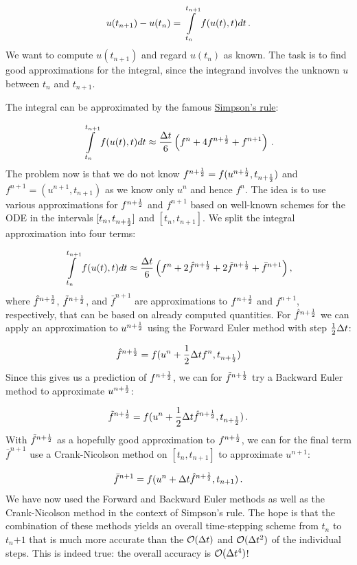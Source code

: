 \documentclass[%
oneside,                 %
final,                   %
10pt]{article}
\begin{document}
\[ u(t_{n+1}) - u(t_n) = \int\limits_{t_{n}}^{t_{n+1}} f(u(t),t)dt\thinspace . \]
We want to compute $u(t_{n+1})$ and regard $u(t_n)$ as known.
The task is to find good approximations for the integral, since the
integrand involves the unknown $u$ between $t_n$ and $t_{n+1}$.

The integral can be approximated by the famous
\href{{http://en.wikipedia.org/wiki/Simpson's_rule}}{Simpson's rule}:

\[ \int\limits_{t_{n}}^{t_{n+1}} f(u(t),t)dt
\approx \frac{\Delta t}{6}\left( f^n + 4f^{n+\frac{1}{2}} + f^{n+1}\right)\thinspace .\]
The problem now is that we do not know $f^{n+\frac{1}{2}}=f(u^{n+\frac{1}{2}},t_{n+\frac{1}{2}})$
and $f^{n+1}=(u^{n+1},t_{n+1})$ as we know only $u^n$ and hence $f^n$.
The idea is to use various approximations for $f^{n+\frac{1}{2}}$ and
$f^{n+1}$ based on well-known schemes for the ODE in the
intervals $[t_n,t_{n+\frac{1}{2}}]$ and $[t_n, t_{n+1}]$.
We split the integral approximation into four terms:

\[ \int\limits_{t_{n}}^{t_{n+1}} f(u(t),t)dt
\approx \frac{\Delta t}{6}\left( f^n + 2\hat{f}^{n+\frac{1}{2}}
+ 2\tilde{f}^{n+\frac{1}{2}} + \bar{f}^{n+1}\right),\]
where $\hat{f}^{n+\frac{1}{2}}$, $\tilde{f}^{n+\frac{1}{2}}$, and $\bar{f}^{n+1}$
are approximations to $f^{n+\frac{1}{2}}$ and
$f^{n+1}$, respectively, that can be based on already computed quantities.
For $\hat{f}^{n+\frac{1}{2}}$ we can apply
an approximation to $u^{n+\frac{1}{2}}$ using the Forward Euler
method with step $\frac{1}{2}\Delta t$:

\begin{equation}
\hat{f}^{n+\frac{1}{2}} = f(u^n + \frac{1}{2}{\Delta t} f^n, t_{n+\frac{1}{2}})
\label{decay:fd2:RK4:hatf}
\end{equation}
Since this gives us a prediction of $f^{n+\frac{1}{2}}$, we can for
$\tilde{f}^{n+\frac{1}{2}}$ try a Backward Euler method to approximate $u^{n+\frac{1}{2}}$:

\begin{equation}
\tilde{f}^{n+\frac{1}{2}} = f(u^n + \frac{1}{2}\Delta t\hat{f}^{n+\frac{1}{2}}, t_{n+\frac{1}{2}})\thinspace .
\label{decay:fd2:RK4:tildef}
\end{equation}
With $\tilde{f}^{n+\frac{1}{2}}$ as a hopefully good approximation to
$f^{n+\frac{1}{2}}$, we can for the final term $\bar{f}^{n+1}$ use
a Crank-Nicolson method on $[t_n, t_{n+1}]$ to approximate $u^{n+1}$:

\begin{equation}
\bar{f}^{n+1} = f(u^n + \Delta t \hat{f}^{n+\frac{1}{2}}, t_{n+1})\thinspace .
\label{decay:fd2:RK4:barf}
\end{equation}
We have now used the Forward and Backward Euler methods as well as the
Crank-Nicolson method in the context of Simpson's rule. The hope is
that the combination of these methods yields an overall time-stepping
scheme from $t_n$ to $t_n{+1}$ that is much more accurate than the
$\mathcal{O}(\Delta t)$ and $\mathcal{O}(\Delta t^2)$ of the individual steps.
This is indeed true: the overall accuracy is $\mathcal{O}(\Delta t^4)$!
\end{document}
